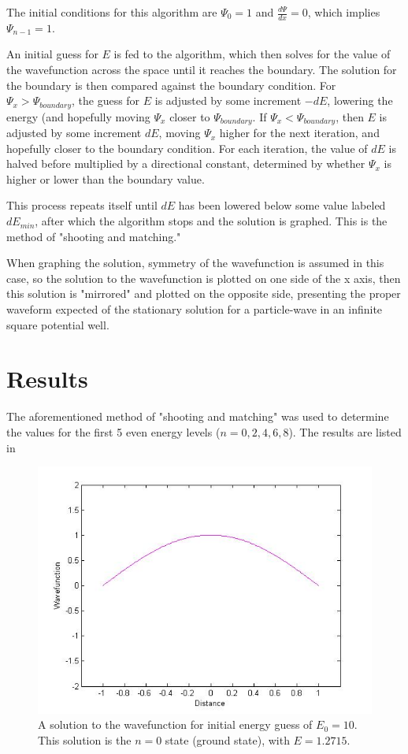 \documentclass[12pt]{article}                  %
\begin{document}
The initial conditions for this algorithm are $\Psi_{0} = 1$ and $\frac{d\Psi}{dx} = 0$, which implies $\Psi_{n-1} = 1$. 

An initial guess for $E$ is fed to the algorithm, which then solves for the value of the wavefunction across the space until it reaches the boundary. The solution for the boundary is then compared against the boundary condition. For $\Psi_{x} > \Psi_{boundary}$, the guess for $E$ is adjusted by some increment $-dE$, lowering the energy (and hopefully moving $\Psi_{x}$ closer to $\Psi_{boundary}$. If $\Psi_{x} < \Psi_{boundary}$, then $E$ is adjusted by some increment $dE$, moving $\Psi_{x}$ higher for the next iteration, and hopefully closer to the boundary condition. For each iteration, the value of $dE$ is halved before multiplied by a directional constant, determined by whether $\Psi_{x}$ is higher or lower than the boundary value. 

This process repeats itself until $dE$ has been lowered below some value labeled $dE_{min}$, after which the algorithm stops and the solution is graphed. This is the method of "shooting and matching."

When graphing the solution, symmetry of the wavefunction is assumed in this case, so the solution to the wavefunction is plotted on one side of the x axis, then this solution is "mirrored" and plotted on the opposite side, presenting the proper waveform expected of the stationary solution for a particle-wave in an infinite square potential well. 

\pagebreak

\section{Results}
The aforementioned method of "shooting and matching" was used to determine the values for the first 5 even energy levels ($n = 0, 2, 4, 6, 8$). The results are listed in 

\begin{figure}[H]
\centering
\includegraphics[scale=0.45]{aogle_final_n_0.jpg}
\caption{A solution to the wavefunction for initial energy guess of $E_{0} = 10$. This solution is the $n = 0$ state (ground state), with $E = 1.2715$.}
\label{wavefunction n = 0}
\end{figure}
\end{document}
